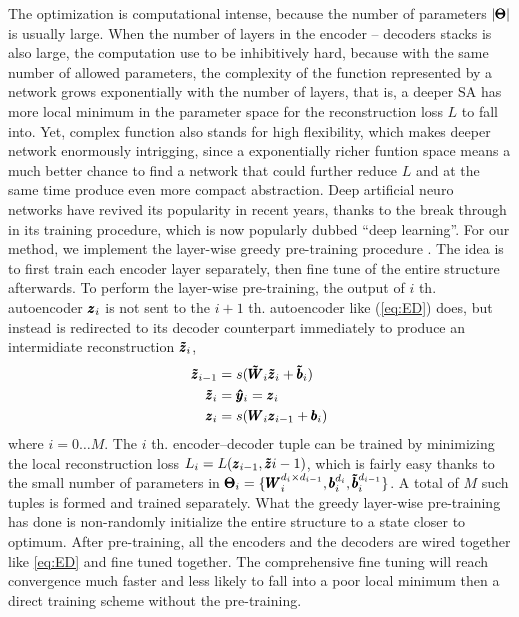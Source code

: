 {The optimization is computational intense, because the number of parameters $|\pmb{\Theta}|$ is usually large. When the number of layers in the encoder -- decoders stacks is also large, the computation use to be inhibitively hard, because with the same number of allowed parameters, the complexity of the function represented by a network grows exponentially with the number of layers, that is, a deeper SA has more local minimum in the parameter space for the reconstruction loss $L$ to fall into. Yet, complex function also stands for high flexibility, which makes deeper network enormously intrigging, since a exponentially richer funtion space means a much better chance to find a network that could further reduce $L$ and at the same time produce even more compact abstraction. Deep artificial neuro networks have revived its popularity in recent years, thanks to the break through in its training procedure, which is now popularly dubbed ``deep learning''. For our method, we implement the layer-wise greedy pre-training procedure \cite{DL:DBN1, DL:SDA1}. The idea is to first train each encoder layer separately, then fine tune of the entire structure afterwards. To perform the layer-wise pre-training, the output of $i$ th. autoencoder $\pmb{z}_i$ is not sent to the $i+1$ th. autoencoder like (\ref{eq:ED}) does, but instead is redirected to its decoder counterpart immediately to produce an intermidiate reconstruction $\pmb{\tilde{z}}_i$, 
\begin{equation}\label{eq:Greedy}
  \begin{split}
    \pmb{\tilde{z}}_{i-1} &= s(\pmb{\tilde{W}}_i \pmb{\tilde{z}}_i + \pmb{\tilde{b}}_i) \\
    \pmb{\tilde{z}}_{i  } &= \pmb{\hat{y}}_i = \pmb{z}_i \\
    \pmb{z}_{i  } &= s(\pmb{W}_i\pmb{z}_{i-1} + \pmb{b}_i) \\
  \end{split}
\end{equation}
where $i = 0 \dots M$. The $i$ th. encoder--decoder tuple can be trained by minimizing the local reconstruction loss $L_i=L(\pmb{z}_{i-1}, \pmb{\tilde{z}}{i-1})$, which is fairly easy thanks to the small number of parameters in $\pmb{\Theta}_i=\{\pmb{W}_{i}^{d_{i} \times d_{i-1}}, \pmb{b}_{i}^{d_{i}}, \pmb{\tilde{b}}_{i}^{d_{i-1}}\}$. A total of $M$ such tuples is formed and trained separately. What the greedy layer-wise pre-training has done is non-randomly initialize the entire structure to a state closer to optimum. After pre-training, all the encoders and the decoders are wired together like \ref{eq:ED} and fine tuned together. The comprehensive fine tuning will reach convergence much faster and less likely to fall into a poor local minimum then a direct training scheme without the pre-training. 

}
